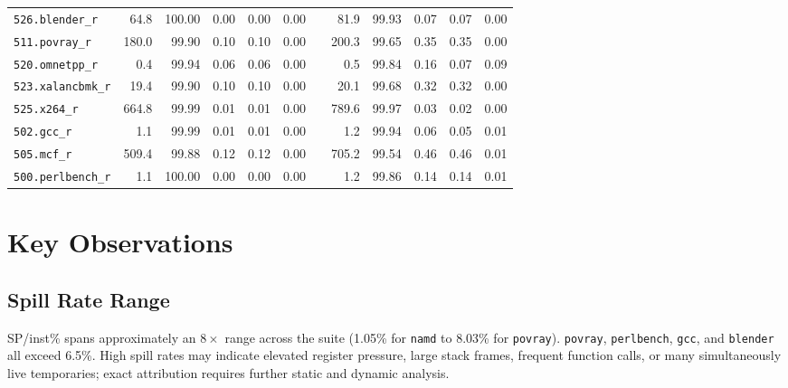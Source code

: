 \documentclass[conference]{IEEEtran}
\begin{document}
\begin{landscape}
\begin{table}[p]
\begin{tabular}{lrrrrrrrrrrr}
\texttt{526.blender\_r} & 64.8 & 100.00 & 0.00 & 0.00 & 0.00 && 81.9 & 99.93 & 0.07 & 0.07 & 0.00 \\

\texttt{511.povray\_r} & 180.0 & 99.90 & 0.10 & 0.10 & 0.00 && 200.3 & 99.65 & 0.35 & 0.35 & 0.00 \\

\texttt{520.omnetpp\_r} & 0.4 & 99.94 & 0.06 & 0.06 & 0.00 && 0.5 & 99.84 & 0.16 & 0.07 & 0.09 \\

\texttt{523.xalancbmk\_r} & 19.4 & 99.90 & 0.10 & 0.10 & 0.00 && 20.1 & 99.68 & 0.32 & 0.32 & 0.00 \\

\texttt{525.x264\_r} & 664.8 & 99.99 & 0.01 & 0.01 & 0.00 && 789.6 & 99.97 & 0.03 & 0.02 & 0.00 \\

\texttt{502.gcc\_r} & 1.1 & 99.99 & 0.01 & 0.01 & 0.00 && 1.2 & 99.94 & 0.06 & 0.05 & 0.01 \\

\texttt{505.mcf\_r} & 509.4 & 99.88 & 0.12 & 0.12 & 0.00 && 705.2 & 99.54 & 0.46 & 0.46 & 0.01 \\

\texttt{500.perlbench\_r} & 1.1 & 100.00 & 0.00 & 0.00 & 0.00 && 1.2 & 99.86 & 0.14 & 0.14 & 0.01 \\

\bottomrule\end{tabular}\end{table}
\end{landscape}


\section{Key Observations}

\subsection{Spill Rate Range}

SP/inst\% spans approximately an $8\times$ range across the suite
(1.05\% for \texttt{namd} to 8.03\% for \texttt{povray}).
\texttt{povray}, \texttt{perlbench}, \texttt{gcc}, and \texttt{blender}
all exceed 6.5\%.  High spill rates may indicate elevated register
pressure, large stack frames, frequent function calls, or many
simultaneously live temporaries; exact attribution requires further
static and dynamic analysis.
\end{document}
